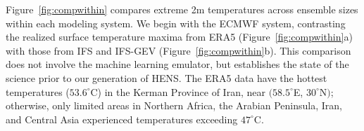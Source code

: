 \documentclass[draft]{agujournal2019}
\begin{document}


Figure~\ref{fig:compwithin} compares extreme 2m temperatures across ensemble sizes within each modeling system. We begin with the ECMWF system, contrasting the realized surface temperature maxima from ERA5 (Figure~\ref{fig:compwithin}a) with those from IFS and IFS-GEV (Figure~\ref{fig:compwithin}b). This comparison does not involve the machine learning emulator, but establishes the state of the science prior to our generation of HENS. The ERA5 data have the hottest temperatures ($53.6^\circ$C) in the Kerman Province of Iran, near $(58.5^\circ$E, $30^\circ$N$)$; otherwise, only limited areas in Northern Africa, the Arabian Peninsula, Iran, and Central Asia experienced temperatures exceeding $47^\circ$C.
\end{document}
